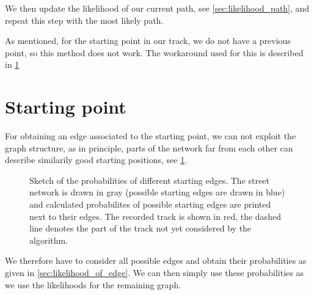 \documentclass[notitlepage]{scrarticle}
\begin{document}
We then update the likelihood of our current path, see \cref{sec:likelihood_path}, and repeat this step with the most likely path.

As mentioned, for the starting point in our track, we do not have a previous point, so this method does not work.
The workaround used for this is described in \cref{sec:starting_point}

\section{Starting point}\label{sec:starting_point}
For obtaining an edge associated to the starting point, we can not exploit the graph structure, as in principle, parts of the network far from each other can describe similarily good starting positions, see \cref{fig:starting_edge}.

\begin{figure}[ht]
	\centering
	\caption{Sketch of the probabilities of different starting edges.
		The street network is drawn in gray (possible starting edges are drawn in blue) and calculated probabilites of possible starting edges are printed next to their edges.
		The recorded track is shown in red, the dashed line denotes the part of the track not yet considered by the algorithm.}
	\label{fig:starting_edge}
\end{figure}

We therefore have to consider all possible edges and obtain their probabilities as given in \cref{sec:likelihood_of_edge}.
We can then simply use these probabilities as we use the likelihoods for the remaining graph.
\end{document}
